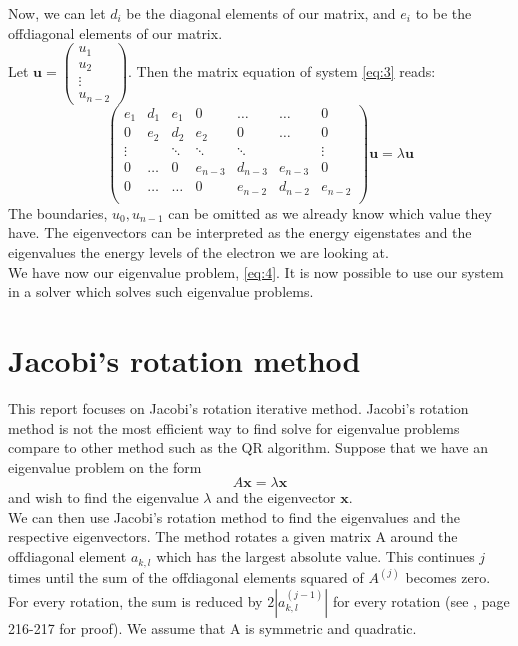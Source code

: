 \documentclass[12pt]{article}
\begin{document}
	 Now, we can let $d_i$ be the diagonal elements of our matrix, and $e_i$ to be the offdiagonal elements of our matrix. \\
	 Let $\mathbf{u} = \begin{pmatrix}
	 u_1 \\
	 u_2 \\
	 \vdots \\
	 u_{n-2}
	 \end{pmatrix}$. Then the matrix equation of system \ref{eq:3} reads:
	 \begin{equation} \label{eq:4}
	 	 \begin{pmatrix}
	 	 e_1 & d_1 & e_1 & 0    & \dots  &\dots     &0 \\
	 	 0   & e_2 & d_2 & e_2  &0       &\dots & 0\\
	 	 \vdots  &  & \ddots & \ddots  &\ddots      & & \vdots\\
	 	  0   &\dots & 0 &  e_{n-3}     &d_{n-3} & e_{n-3} & 0\\
	 	 0   &\dots & \dots & 0  &  e_{n-2}     &d_{n-2} & e_{n-2}\\
	 	 \end{pmatrix} \mathbf{u} = \lambda\mathbf{u}
	 \end{equation}
	 The boundaries, $u_0,u_{n-1}$ can be omitted as we already know which value they have. 
	 The eigenvectors can be interpreted as the energy eigenstates and the eigenvalues the energy levels of the electron we are looking at.  \\
	 We have now our eigenvalue problem, \ref{eq:4}. It is now possible to use our system in a solver which solves such eigenvalue problems. 
	 \section{Jacobi's rotation method}
	 This report focuses on Jacobi's rotation iterative method. Jacobi's rotation method is not the most efficient way to find solve for eigenvalue problems compare to other method such as the QR algorithm. 
	Suppose that we have an eigenvalue problem on the form 
	 $$
	 A \mathbf{x} = \lambda \mathbf{x}
	 $$
	 and wish to find the eigenvalue $\lambda$ and the eigenvector $\mathbf{x}$. \\
	 We can then use Jacobi's rotation method to find the eigenvalues and the respective eigenvectors. The method rotates a given matrix A around the offdiagonal element $a_{k,l}$ which has the largest absolute value. This continues $j$ times until the sum of the offdiagonal elements squared of $A^{(j)}$ becomes zero. For every rotation, the sum is reduced by $2|a_{k,l}^{(j-1)}|$ for every rotation (see \cite{lectureNotes}, page 216-217 for proof). We assume that A is symmetric and quadratic. 
\end{document}
